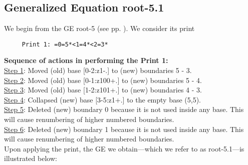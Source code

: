 \documentclass[final]{article}
\begin{document}
\subsection*{Generalized Equation root-5.1}
\label{root-5.1}We begin from the GE root-5 (see pp. \pageref{root-5}).  {We consider its print}
\begin{verbatim}
     Print 1: =0=5*<1=4*<2=3*
\end{verbatim}
{\bf Sequence of actions in performing the Print 1:}\\
{\underline{Step 1}:} Moved (old) base [0-2:z1-.]  to (new) boundaries 5 - 3.\\
{\underline{Step 2}:} Moved (old) base [0-1:z100+.]  to (new) boundaries 5 - 4.\\
{\underline{Step 3}:} Moved (old) base [1-2:z101+.]  to (new) boundaries 4 - 3.\\
{\underline{Step 4}:} Collapsed (new) base [3-5:z1+.]  to the empty base (5,5).
\\
{\underline{Step 5}:} Deleted (new) boundary 0 because it is not used inside any base.  This will cause renumbering of higher numbered boundaries.
\\
{\underline{Step 6}:} Deleted (new) boundary 1 because it is not used inside any base.  This will cause renumbering of higher numbered boundaries.
\\[0.1in]
{Upon applying the print, the GE we obtain---which we refer to as root-5.1---is illustrated below:}
\end{document}
